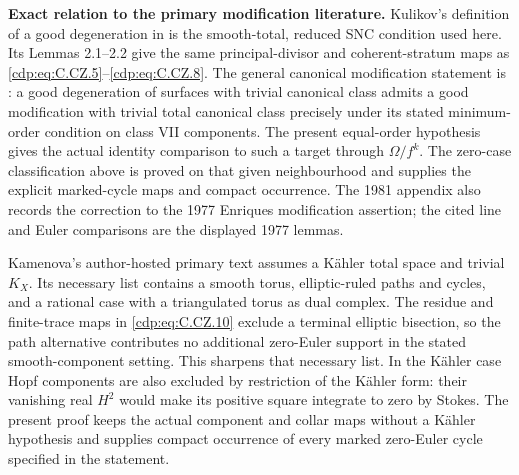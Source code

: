 \par\medskip\noindent\textbf{Exact relation to the primary modification literature.}
Kulikov's definition of a good degeneration in
\cite[p.~958]{Kulikov1977} is the smooth-total,
reduced SNC condition used here. Its Lemmas 2.1--2.2
give the same principal-divisor and coherent-stratum
maps as \eqref{cdp:eq:C.CZ.5}--\eqref{cdp:eq:C.CZ.8}. The general canonical
modification statement is
\cite[Theorem 1$'$]{Kulikov1981}: a good degeneration
of surfaces with trivial canonical class admits a
good modification with trivial total canonical
class precisely under its stated minimum-order
condition on class VII components. The present
equal-order hypothesis gives the actual identity
comparison to such a target through $\Omega/f^k$.
The zero-case classification above is proved on
that given neighbourhood and supplies the explicit
marked-cycle maps and compact occurrence. The
1981 appendix also records the correction to the
1977 Enriques modification assertion; the cited
line and Euler comparisons are the displayed
1977 lemmas.

Kamenova's author-hosted primary text
\cite[Theorem 3.1]{KamenovaTori} assumes a
K\"ahler total space and trivial $K_X$.
Its necessary list contains a smooth torus,
elliptic-ruled paths and cycles, and a rational
case with a triangulated torus as dual complex.
The residue and finite-trace maps in
\eqref{cdp:eq:C.CZ.10} exclude a terminal elliptic bisection,
so the path alternative contributes no
additional zero-Euler support in the stated
smooth-component setting. This sharpens that
necessary list. In the K\"ahler case Hopf
components are also excluded by restriction
of the K\"ahler form: their vanishing real
$H^2$ would make its positive square integrate
to zero by Stokes. The present proof keeps
the actual component and collar maps without
a K\"ahler hypothesis and supplies compact
occurrence of every marked zero-Euler cycle
specified in the statement.


